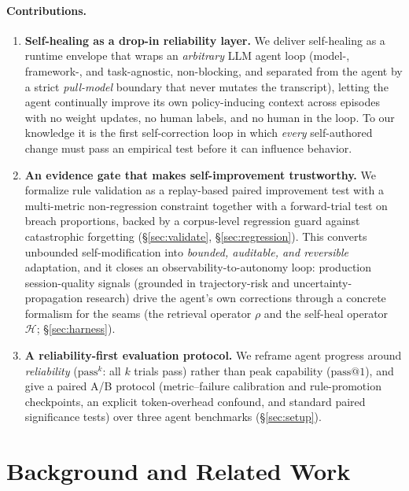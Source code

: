 \documentclass[letterpaper]{article} %
\makeatletter
\newcommand{\Heal}{\mathcal{H}}                   %
\newcommand{\passk}{\mathrm{pass}^{k}}
\newcommand{\passone}{\mathrm{pass@}1}
\makeatother
\begin{document}
\paragraph{Contributions.}
\begin{enumerate}\itemsep2pt
\item \textbf{Self-healing as a drop-in reliability layer.} We deliver self-healing as a runtime
envelope that wraps an \emph{arbitrary} LLM agent loop (model-, framework-, and task-agnostic,
non-blocking, and separated from the agent by a strict \emph{pull-model} boundary that never
mutates the transcript), letting the agent continually improve its own policy-inducing context
across episodes with no weight updates, no human labels, and no human in the loop. To our
knowledge it is the first self-correction loop in which \emph{every} self-authored change must
pass an empirical test before it can influence behavior.
\item \textbf{An evidence gate that makes self-improvement trustworthy.} We formalize rule
validation as a replay-based paired improvement test with a multi-metric non-regression
constraint together with a forward-trial test on breach proportions, backed by a corpus-level
regression guard against catastrophic forgetting (\S\ref{sec:validate}, \S\ref{sec:regression}).
This converts unbounded self-modification into \emph{bounded, auditable, and reversible}
adaptation, and it closes an observability-to-autonomy loop: production session-quality signals
(grounded in trajectory-risk and uncertainty-propagation research) drive the agent's own
corrections through a concrete formalism for the seams (the retrieval operator $\rho$ and the
self-heal operator $\Heal$; \S\ref{sec:harness}).
\item \textbf{A reliability-first evaluation protocol.} We reframe agent progress around
\emph{reliability} ($\passk$: all $k$ trials pass) rather than peak capability ($\passone$), and
give a paired A/B protocol (metric--failure calibration and rule-promotion checkpoints, an
explicit token-overhead confound, and standard paired significance tests) over three agent
benchmarks (\S\ref{sec:setup}).
\end{enumerate}

\section{Background and Related Work}
\label{sec:related}
\end{document}
